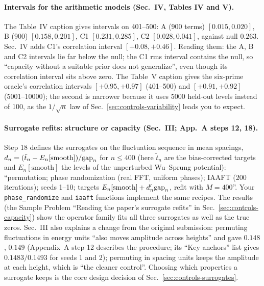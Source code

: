 \paragraph{Intervals for the arithmetic models (Sec.~IV, Tables IV and V).} The Table~IV caption gives intervals on 401--500: A (900 terms) $[0.015,0.020]$, B (900) $[0.158,0.201]$, C1 $[0.231,0.285]$, C2 $[0.028,0.041]$, against null $0.263$. Sec.~IV adds C1's correlation interval $[+0.08,+0.46]$. Reading them: the A, B and C2 intervals lie far below the null; the C1 rms interval contains the null, so ``capacity without a suitable prior does not generalize'', even though its correlation interval sits above zero. The Table~V caption gives the six-prime oracle's correlation intervals $[+0.95,+0.97]$ (401--500) and $[+0.91,+0.92]$ (5001--10000); the second is narrower because it uses 5000 held-out levels instead of 100, as the $1/\sqrt n$ law of Sec.~\ref{sec:controls-variability} leads you to expect.

\paragraph{Surrogate refits: structure or capacity (Sec.~III; App.~A steps 12, 18).} Step 18 defines the surrogates on the fluctuation sequence in mean spacings, $d_n=(\tilde t_n-E_n[\text{smooth}])/\mathrm{gap}_n$ for $n\le400$ (here $\tilde t_n$ are the bias-corrected targets and $E_n[\text{smooth}]$ the levels of the unperturbed Wu--Sprung potential): ``permutation; phase randomization (real FFT, uniform phases); IAAFT (200 iterations); seeds 1--10; targets $E_n[\text{smooth}]+d'_n\mathrm{gap}_n$, refit with $M=400$''. Your \texttt{phase\_randomize} and \texttt{iaaft} functions implement the same recipes. The results (the Sample Problem ``Reading the paper's surrogate refits'' in Sec.~\ref{sec:controls-capacity}) show the operator family fits all three surrogates as well as the true zeros. Sec.~III also explains a change from the original submission: permuting fluctuations in energy units ``also moves amplitude across heights'' and gave $0.148$, $0.149$ (Appendix~A step 12 describes the procedure; its ``Key anchors'' list gives $0.1483/0.1493$ for seeds 1 and 2); permuting in spacing units keeps the amplitude at each height, which is ``the cleaner control''. Choosing which properties a surrogate keeps is the core design decision of Sec.~\ref{sec:controls-surrogates}.

